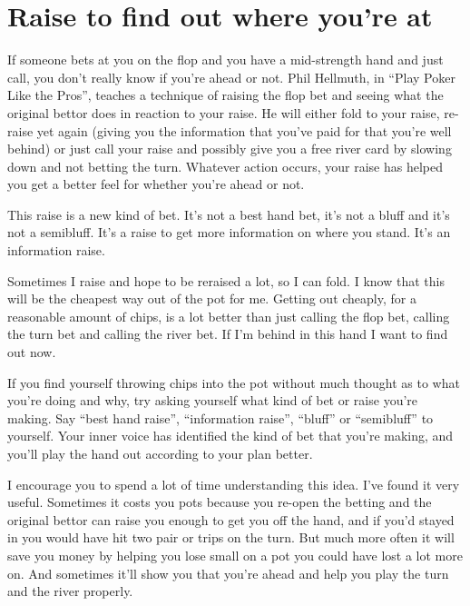 \section{Raise to find out where you're at}

If someone bets at you on the flop and you have a mid-strength hand
and just call, you don't really know if you're ahead or not. Phil
Hellmuth, in ``Play Poker Like the Pros'', teaches a technique of
raising the flop bet and seeing what the original bettor does in
reaction to your raise. He will either fold to your raise, re-raise
yet again (giving you the information that you've paid for that you're
well behind) or just call your raise and possibly give you a free river
card by slowing down and not betting the turn.
Whatever action occurs, your raise has helped you get a better feel for
whether you're ahead or not.


This raise is a new kind of bet. It's not a best hand bet, it's not a
bluff and it's not a semibluff. It's a raise to get more information
on where you stand. It's an information raise.

Sometimes I raise and hope to be reraised a lot, so I can fold. I know that this
will be the cheapest way out of the pot for me. Getting out cheaply, for
a reasonable amount of chips, is a lot better than just calling the flop bet,
calling the turn bet and calling the river bet. If I'm behind in this hand
I want to find out now.

If you find yourself throwing chips into the pot without much thought
as to what you're doing and why, try asking yourself what kind of
bet or raise you're making. Say ``best hand raise'', ``information raise'',
``bluff'' or ``semibluff'' to yourself. Your inner voice has identified
the kind of bet that you're making, and you'll play the hand out
according to your plan better.

I encourage you to spend a lot of time understanding this idea. I've
found it very useful. Sometimes it costs you pots because you re-open
the betting and the original bettor can raise you enough to get you
off the hand, and if you'd stayed in you would have hit two pair or
trips on the turn. But much more often it will save you money by helping
you lose small on a pot you could have lost a lot more on. And sometimes
it'll show you that you're ahead and help you play the turn and the
river properly.

